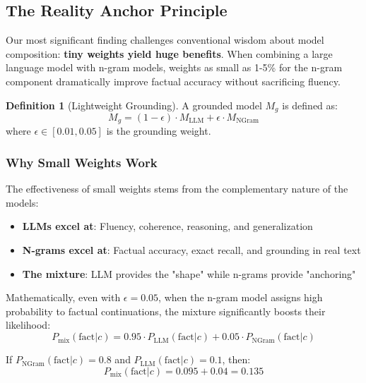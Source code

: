 \documentclass{article}
\theoremstyle{definition}
\newtheorem{definition}{Definition}
\begin{document}
\subsection{The Reality Anchor Principle}

Our most significant finding challenges conventional wisdom about model composition: \textbf{tiny weights yield huge benefits}. When combining a large language model with n-gram models, weights as small as 1-5\% for the n-gram component dramatically improve factual accuracy without sacrificing fluency.

\begin{definition}[Lightweight Grounding]
A grounded model $M_g$ is defined as:
\begin{equation}
M_g = (1-\epsilon) \cdot M_{\text{LLM}} + \epsilon \cdot M_{\text{NGram}}
\end{equation}
where $\epsilon \in [0.01, 0.05]$ is the grounding weight.
\end{definition}

\subsubsection{Why Small Weights Work}

The effectiveness of small weights stems from the complementary nature of the models:
\begin{itemize}
    \item \textbf{LLMs excel at}: Fluency, coherence, reasoning, and generalization
    \item \textbf{N-grams excel at}: Factual accuracy, exact recall, and grounding in real text
    \item \textbf{The mixture}: LLM provides the "shape" while n-grams provide "anchoring"
\end{itemize}

Mathematically, even with $\epsilon = 0.05$, when the n-gram model assigns high probability to factual continuations, the mixture significantly boosts their likelihood:
\begin{equation}
P_{\text{mix}}(\text{fact}|c) = 0.95 \cdot P_{\text{LLM}}(\text{fact}|c) + 0.05 \cdot P_{\text{NGram}}(\text{fact}|c)
\end{equation}

If $P_{\text{NGram}}(\text{fact}|c) = 0.8$ and $P_{\text{LLM}}(\text{fact}|c) = 0.1$, then:
\begin{equation}
P_{\text{mix}}(\text{fact}|c) = 0.095 + 0.04 = 0.135
\end{equation}
\end{document}
